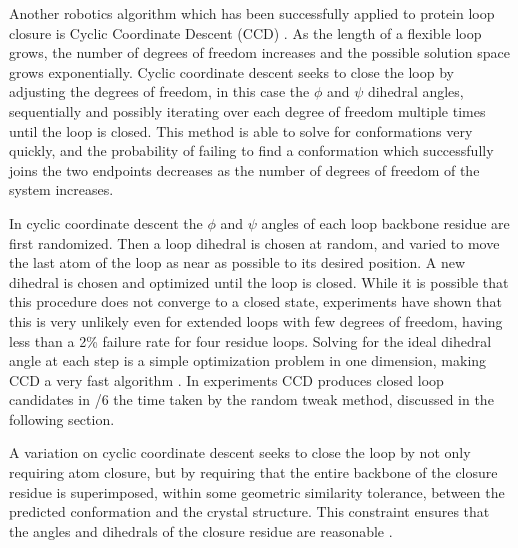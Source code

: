 Another robotics algorithm which has been successfully applied to protein loop closure is Cyclic Coordinate Descent (CCD) \cite{canutescu2003cyclic}.
As the length of a flexible loop grows, the number of degrees of freedom increases and the possible solution space grows exponentially. 
Cyclic coordinate descent seeks to close the loop by adjusting the degrees of freedom, in this case the $\phi$ and $\psi$ dihedral angles, sequentially and possibly iterating over each degree of freedom multiple times until the loop is closed.
This method is able to solve for conformations very quickly, and the probability of failing to find a conformation which successfully joins the two endpoints decreases as the number of degrees of freedom of the system increases.

In cyclic coordinate descent the $\phi$ and $\psi$ angles of each loop backbone residue are first randomized.
Then a loop dihedral is chosen at random, and varied to move the last atom of the loop as near as possible to its desired position.
A new dihedral is chosen and optimized until the loop is closed.
While it is possible that this procedure does not converge to a closed state, experiments have shown that this is very unlikely even for extended loops with few degrees of freedom, having less than a 2\% failure rate for four residue loops.
Solving for the ideal dihedral angle at each step is a simple optimization problem in one dimension, making CCD a very fast algorithm \cite{wang1991combined,canutescu2003cyclic}.
In experiments CCD produces closed loop candidates in /6 the time taken by the random tweak method, discussed in the following section.

A variation on cyclic coordinate descent seeks to close the loop by not only requiring atom closure, but by requiring that the entire backbone of the closure residue is superimposed, within some geometric similarity tolerance, between the predicted conformation and the  crystal structure.
This constraint ensures that the angles and dihedrals of the closure residue are reasonable \cite{canutescu2003cyclic}.
